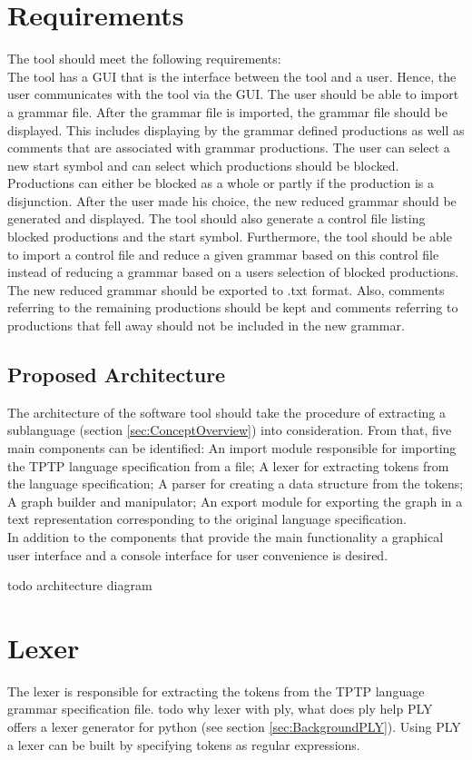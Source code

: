  \section{Requirements}\label{sec:ConceptRequirements}
The tool should meet the following requirements:\\
The tool has a GUI that is the interface between the tool and a user. Hence, the user communicates with the tool via the GUI. The user should be able to import a grammar file. After the grammar file is imported, the grammar file should be displayed. 
This includes displaying by the grammar defined productions as well as comments that are associated with grammar productions.
The user can select a new start symbol and can select which productions should be blocked. 
Productions can either be blocked as a whole or partly if the production is a disjunction.
After the user made his choice, the new reduced grammar should be generated and displayed.
The tool should also generate a control file listing blocked productions and the start symbol.
Furthermore, the tool should be able to import a control file and reduce a given grammar based on this control file instead of reducing a grammar based on a users selection of blocked productions.
The new reduced grammar should be exported to .txt format.
Also, comments referring to the remaining productions should be kept and comments referring to productions that fell away should not be included in the new grammar.
\subsection{Proposed Architecture}\label{sec:ConceptProposedArchitecture}
The architecture of the software tool should take the procedure of extracting a sublanguage (section \ref{sec:ConceptOverview}) into consideration.
From that, five main components can be identified:
An import module responsible for importing the \ac{TPTP} language specification from a file;
A lexer for extracting tokens from the language specification; A parser for creating a data structure from the tokens;
A graph builder and manipulator;
An export module for exporting the graph in a text representation corresponding to the original language specification.\\
In addition to the components that provide the main functionality a graphical user interface and a console interface for user convenience is desired.

todo architecture diagram

\section{Lexer}\label{sec:ConceptLexer}
The lexer is responsible for extracting the tokens from the \ac{TPTP} language grammar specification file.
todo why lexer with ply, what does ply help
\ac{PLY} offers a lexer generator for python (see section \ref{sec:BackgroundPLY}).
Using \ac{PLY} a lexer can be built by specifying tokens as regular expressions.


